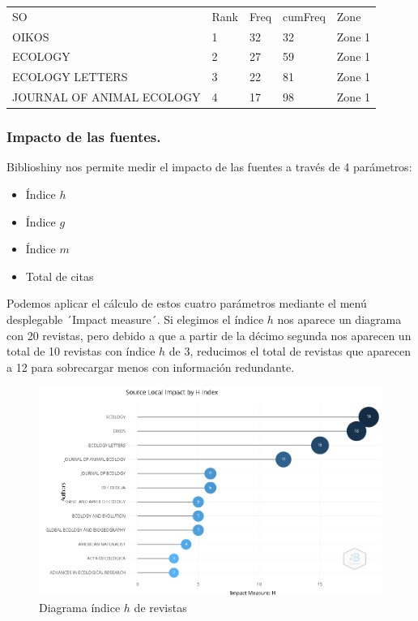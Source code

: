 \documentclass[
]{article}
\providecommand{\tightlist}{%
  \setlength{\itemsep}{0pt}\setlength{\parskip}{0pt}}
\begin{document}
\begin{longtable}[]{@{}lllll@{}}
\toprule
& & & & \\
\midrule
\endhead
SO & Rank & Freq & cumFreq & Zone \\
OIKOS & 1 & 32 & 32 & Zone 1 \\
ECOLOGY & 2 & 27 & 59 & Zone 1 \\
ECOLOGY LETTERS & 3 & 22 & 81 & Zone 1 \\
JOURNAL OF ANIMAL ECOLOGY & 4 & 17 & 98 & Zone 1 \\
\bottomrule
\end{longtable}

\hypertarget{impacto-de-las-fuentes.}{%
\subsubsection{Impacto de las fuentes.}\label{impacto-de-las-fuentes.}}

Biblioshiny nos permite medir el impacto de las fuentes a través de 4
parámetros:

\begin{itemize}
\tightlist
\item
  Índice \(h\)
\item
  Índice \(g\)
\item
  Índice \(m\)
\item
  Total de citas
\end{itemize}

Podemos aplicar el cálculo de estos cuatro parámetros mediante el menú
desplegable ´Impact measure´. Si elegimos el índice \(h\) nos aparece un
diagrama con 20 revistas, pero debido a que a partir de la décimo
segunda nos aparecen un total de 10 revistas con índice \(h\) de 3,
reducimos el total de revistas que aparecen a 12 para sobrecargar menos
con información redundante.

\begin{figure}
\centering
\includegraphics{SourceImpactByHIndex.png}
\caption{Diagrama índice \(h\) de revistas}
\end{figure}
\end{document}
